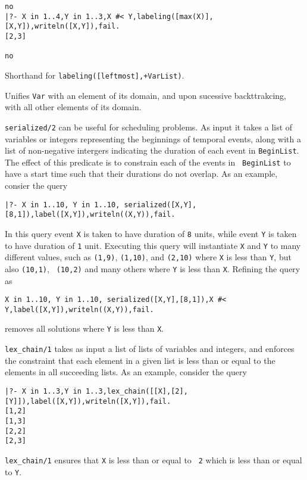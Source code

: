 \begin{description}
\begin{itemize}
{\begin{verbatim}
no
|?- X in 1..4,Y in 1..3,X #< Y,labeling([max(X)],[X,Y]),writeln([X,Y]),fail.
[2,3]

no
\end{verbatim}
}
\end{itemize}

%
Shorthand for {\tt labeling([leftmost],+VarList)}.

\index{\texttt{}}
%
Unifies {\tt Var} with an element of its domain, and upon sucessive
backttrakcing, with all other elements of its domain.

% 
{\tt serialized/2} can be useful for scheduling problems.  As input it
takes a list of variables or integers representing the beginnings of
temporal events, along with a list of non-negative intergers
indicating the duration of each event in {\tt BeginList}.  The effect
of this predicate is to constrain each of the events in {\tt
  BeginList} to have a start time such that their durations do not
overlap.  As an example, consier the query
%
{\small
\begin{verbatim}
|?- X in 1..10, Y in 1..10, serialized([X,Y],[8,1]),label([X,Y]),writeln((X,Y)),fail.
\end{verbatim}
}
%
In this query event {\tt X} is taken to have duration of {\tt 8}
units, while event {\tt Y} is taken to have duration of {\tt 1} unit.
Executing this query will instantiate {\tt X} and {\tt Y} to many
different values, such as {\tt (1,9)}, {\tt (1,10)}, and {\tt (2,10)}
where {\tt X} is less than {\tt Y}, but also {\tt (10,1)}, {\tt
  (10,2)} and many others where {\tt Y} is less than {\tt X}.  Refining the query as
%
{\small
\begin{verbatim}
X in 1..10, Y in 1..10, serialized([X,Y],[8,1]),X #< Y,label([X,Y]),writeln((X,Y)),fail.
\end{verbatim}
}
%
removes all solutions where {\tt Y} is less than {\tt X}.

\index{\texttt{}}
%
{\tt lex\_chain/1} takes as input a list of lists of variables and
integers, and enforces the constraint that each element in a given
list is less than or equal to the elements in all succeeding lists.
As an example, consider the query
%
{\small
\begin{verbatim}
|?- X in 1..3,Y in 1..3,lex_chain([[X],[2],[Y]]),label([X,Y]),writeln([X,Y]),fail.
[1,2]
[1,3]
[2,2]
[2,3]
\end{verbatim}
}
%
{\tt lex\_chain/1} ensures that {\tt X} is less than or equal to {\tt
  2} which is less than or equal to {\tt Y}.


\end{description}

